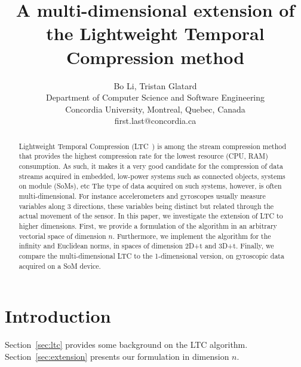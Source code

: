 \documentclass[10pt, conference, compsocconf]{IEEEtran}
\begin{document}
\title{A multi-dimensional extension of the Lightweight Temporal Compression method}

\author{Bo Li, Tristan Glatard\\
  Department of Computer Science and Software Engineering\\ Concordia University, Montreal, Quebec, Canada\\
  {first.last}@concordia.ca \vspace*{-0.5cm}}

\maketitle

\begin{abstract}
Lightweight Temporal Compression 
(LTC~\cite{schoellhammer2004lightweight}) is among the stream 
compression method that provides the highest compression rate for the 
lowest resource (CPU, RAM) consumption. As such, it makes it a very 
good candidate for the compression of data streams acquired in 
embedded, low-power systems such as connected 
objects, systems on module (SoMs), etc The type of data acquired on 
such systems, however, is often multi-dimensional. For instance 
accelerometers and gyroscopes usually measure variables along 3 
directions, these variables being distinct but related through the 
actual movement of the sensor. In this paper, we investigate the 
extension of LTC to higher dimensions. First, we provide a formulation of the algorithm 
in an arbitrary vectorial space of dimension $n$. Furthermore, we 
implement the algorithm for the infinity and Euclidean norms, in spaces of 
dimension 2D+t and 3D+t. Finally, we compare the multi-dimensional LTC 
to the 1-dimensional version, on gyroscopic data acquired on a SoM 
device.
\end{abstract}

\section{Introduction}

Section~\ref{sec:ltc} provides some background on the LTC algorithm. 
Section~\ref{sec:extension} presents our formulation in dimension $n$.




\end{document}
